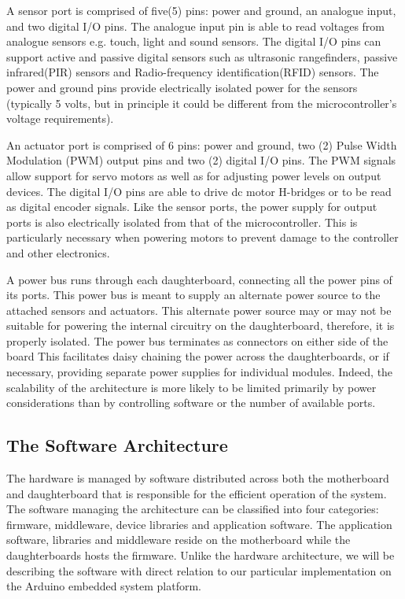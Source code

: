  A sensor port is comprised of five(5) pins: power and ground, an analogue input, and two digital I/O pins. The analogue input pin is able to read voltages from analogue sensors e.g. touch, light and sound sensors. The digital I/O pins can support active and passive digital sensors such as ultrasonic rangefinders,  passive infrared(PIR) sensors and Radio-frequency identification(RFID) sensors. The power and ground pins provide electrically isolated power for the sensors (typically 5 volts, but in principle it could be different from the microcontroller's voltage requirements).

An actuator port is comprised of 6 pins: power and ground, two (2) Pulse Width Modulation (PWM) output pins and two (2) digital I/O pins. The PWM signals allow support for servo motors as well as for adjusting power levels on output devices. The digital I/O pins are able to drive dc motor H-bridges or to be read as digital encoder signals. Like the sensor ports, the power supply for output ports is also electrically isolated from that of the microcontroller. This is particularly necessary when powering motors to prevent damage to the controller and other electronics.

A power bus runs through each daughterboard, connecting all the power pins of its ports. This power bus is meant to supply an alternate power source to the attached sensors and actuators. This alternate power source may or may not be suitable for powering the internal circuitry on the daughterboard, therefore, it is properly isolated.  The power bus terminates as connectors on either side of the board This facilitates daisy chaining the power across the daughterboards, or if necessary, providing separate power supplies for individual modules. Indeed, the scalability of the \xten architecture is more likely to be limited primarily by power considerations than by controlling software or the number of available ports.
\newpage

\subsection{The Software Architecture} %
\label{sub:the_software_architecture}
The \xten hardware is managed by software distributed across both the motherboard and daughterboard that is responsible for the efficient operation of the system. The software managing the architecture can be classified into four categories: firmware, middleware, device libraries and application software. The application software, libraries and middleware reside on the motherboard while the daughterboards hosts the firmware. Unlike the hardware architecture, we will be describing the software with direct relation to our particular implementation on the Arduino embedded system platform.
	

